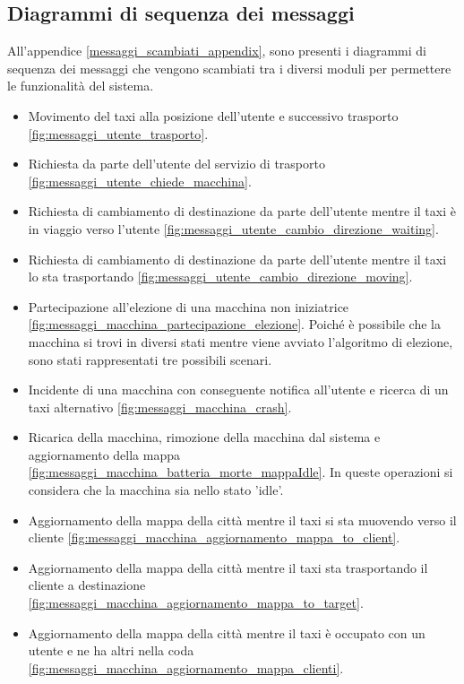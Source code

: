 \subsection{Diagrammi di sequenza dei messaggi}
All'appendice \ref{messaggi_scambiati_appendix}, sono presenti i diagrammi di sequenza dei messaggi che vengono scambiati tra i diversi moduli per permettere le funzionalità del sistema.

\begin{itemize}
	\item Movimento del taxi alla posizione dell'utente e successivo trasporto \ref{fig:messaggi_utente_trasporto}.
	\item Richiesta da parte dell'utente del servizio di trasporto \ref{fig:messaggi_utente_chiede_macchina}.
	\item Richiesta di cambiamento di destinazione da parte dell'utente mentre il taxi è in viaggio verso l'utente \ref{fig:messaggi_utente_cambio_direzione_waiting}.
	\item Richiesta di cambiamento di destinazione da parte dell'utente mentre il taxi lo sta trasportando \ref{fig:messaggi_utente_cambio_direzione_moving}.
	\item Partecipazione all'elezione di una macchina non iniziatrice \ref{fig:messaggi_macchina_partecipazione_elezione}. Poiché è possibile che la macchina si trovi in diversi stati mentre viene avviato l'algoritmo di elezione, sono stati rappresentati tre possibili scenari.
	\item Incidente di una macchina con conseguente notifica all'utente e ricerca di un taxi alternativo \ref{fig:messaggi_macchina_crash}.
	\item Ricarica della macchina, rimozione della macchina dal sistema e aggiornamento della mappa  \ref{fig:messaggi_macchina_batteria_morte_mappaIdle}. In queste operazioni si considera che la macchina sia nello stato 'idle'.
	\item Aggiornamento della mappa della città mentre il taxi si sta muovendo verso il cliente \ref{fig:messaggi_macchina_aggiornamento_mappa_to_client}.
	\item Aggiornamento della mappa della città mentre il taxi sta trasportando il cliente a destinazione \ref{fig:messaggi_macchina_aggiornamento_mappa_to_target}.
	\item Aggiornamento della mappa della città mentre il taxi è occupato con un utente e ne ha altri nella coda \ref{fig:messaggi_macchina_aggiornamento_mappa_clienti}.
\end{itemize}


